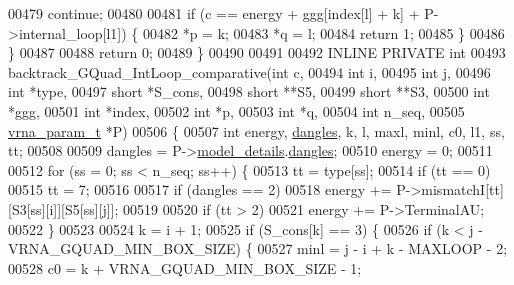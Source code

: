 \begin{DoxyCode}
00479         \textcolor{keywordflow}{continue};
00480 
00481       \textcolor{keywordflow}{if} (c == energy + ggg[index[l] + k] + P->internal\_loop[l1]) \{
00482         *p  = k;
00483         *q  = l;
00484         \textcolor{keywordflow}{return} 1;
00485       \}
00486     \}
00487 
00488   \textcolor{keywordflow}{return} 0;
00489 \}
00490 
00491 
00492 INLINE PRIVATE \textcolor{keywordtype}{int}
00493 backtrack\_GQuad\_IntLoop\_comparative(\textcolor{keywordtype}{int}           c,
00494                                     \textcolor{keywordtype}{int}           i,
00495                                     \textcolor{keywordtype}{int}           j,
00496                                     \textcolor{keywordtype}{int}           *type,
00497                                     \textcolor{keywordtype}{short}         *S\_cons,
00498                                     \textcolor{keywordtype}{short}         **S5,
00499                                     \textcolor{keywordtype}{short}         **S3,
00500                                     \textcolor{keywordtype}{int}           *ggg,
00501                                     \textcolor{keywordtype}{int}           *index,
00502                                     \textcolor{keywordtype}{int}           *p,
00503                                     \textcolor{keywordtype}{int}           *q,
00504                                     \textcolor{keywordtype}{int}           n\_seq,
00505                                     \hyperlink{group__energy__parameters_structvrna__param__s}{vrna\_param\_t}  *P)
00506 \{
00507   \textcolor{keywordtype}{int} energy, \hyperlink{group__model__details_ga72b511ed1201f7e23ec437e468790d74}{dangles}, k, l, maxl, minl, c0, l1, ss, tt;
00508 
00509   dangles = P->\hyperlink{group__energy__parameters_a7b84353eb9075c595bad4ceb871bcae7}{model\_details}.\hyperlink{group__model__details_adcda4ff2ea77748ae0e8700288282efc}{dangles};
00510   energy  = 0;
00511 
00512   \textcolor{keywordflow}{for} (ss = 0; ss < n\_seq; ss++) \{
00513     tt = type[ss];
00514     \textcolor{keywordflow}{if} (tt == 0)
00515       tt = 7;
00516 
00517     \textcolor{keywordflow}{if} (dangles == 2)
00518       energy += P->mismatchI[tt][S3[ss][i]][S5[ss][j]];
00519 
00520     \textcolor{keywordflow}{if} (tt > 2)
00521       energy += P->TerminalAU;
00522   \}
00523 
00524   k = i + 1;
00525   \textcolor{keywordflow}{if} (S\_cons[k] == 3) \{
00526     \textcolor{keywordflow}{if} (k < j - VRNA\_GQUAD\_MIN\_BOX\_SIZE) \{
00527       minl  = j - i + k - MAXLOOP - 2;
00528       c0    = k + VRNA\_GQUAD\_MIN\_BOX\_SIZE - 1;

\end{DoxyCode}
